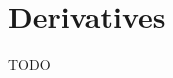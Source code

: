 \documentclass{article}
\title{\doctitle}
\author{\docauthor}
\begin{document}
\maketitle

\section{Derivatives}

TODO
\end{document}
